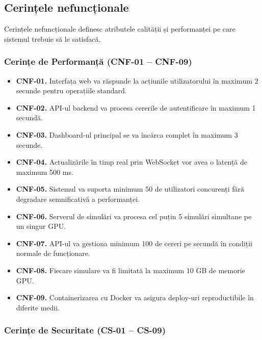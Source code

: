 \documentclass[../../main.tex]{subfiles}
\begin{document}
        \subsection{Cerințele nefuncționale}

        Cerințele nefuncționale definesc atributele calității și performanței pe care sistemul trebuie să le satisfacă.

        \subsubsection{Cerințe de Performanță (CNF-01 -- CNF-09)}

        \begin{itemize}
            \item \textbf{CNF-01.} Interfața web va răspunde la acțiunile utilizatorului în maximum 2 secunde pentru operațiile standard.
            \item \textbf{CNF-02.} API-ul backend va procesa cererile de autentificare în maximum 1 secundă.
            \item \textbf{CNF-03.} Dashboard-ul principal se va încărca complet în maximum 3 secunde.
            \item \textbf{CNF-04.} Actualizările în timp real prin WebSocket vor avea o latență de maximum 500 ms.
            \item \textbf{CNF-05.} Sistemul va suporta minimum 50 de utilizatori concurenți fără degradare semnificativă a performanței.
            \item \textbf{CNF-06.} Serverul de simulări va procesa cel puțin 5 simulări simultane pe un singur GPU.
            \item \textbf{CNF-07.} API-ul va gestiona minimum 100 de cereri pe secundă în condiții normale de funcționare.
            \item \textbf{CNF-08.} Fiecare simulare va fi limitată la maximum 10 GB de memorie GPU.
            \item \textbf{CNF-09.} Containerizarea cu Docker va asigura deploy-uri reproductibile în diferite medii.
        \end{itemize}

        \subsubsection{Cerințe de Securitate (CS-01 -- CS-09)}
\end{document}
